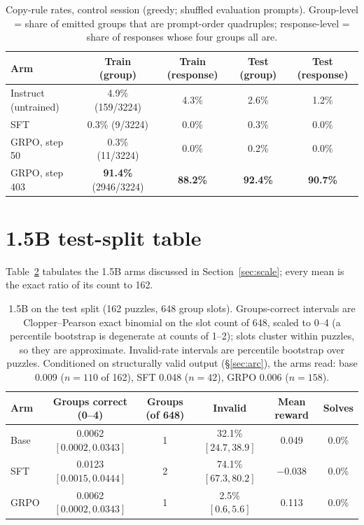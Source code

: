 \documentclass{article}
\begin{document}
\begin{table}[h]
\centering
\caption{Copy-rule rates, control session (greedy; shuffled evaluation
prompts). Group-level = share of emitted groups that are prompt-order
quadruples; response-level = share of responses whose four groups all are.}
\label{tab:copy}
\small
\setlength{\tabcolsep}{4pt}
\begin{tabular}{lcccc}
\toprule
Arm & Train (group) & Train (response) & Test (group) & Test (response) \\
\midrule
Instruct (untrained) & 4.9\% (159/3224) & 4.3\% & 2.6\% & 1.2\% \\
SFT & 0.3\% (9/3224) & 0.0\% & 0.3\% & 0.0\% \\
GRPO, step 50 & 0.3\% (11/3224) & 0.0\% & 0.2\% & 0.0\% \\
GRPO, step 403 & \textbf{91.4\%} (2946/3224) & \textbf{88.2\%} & \textbf{92.4\%} & \textbf{90.7\%} \\
\bottomrule
\end{tabular}
\end{table}

\section{1.5B test-split table}
\label{app:small}

Table~\ref{tab:small} tabulates the 1.5B arms discussed in
Section~\ref{sec:scale}; every mean is the exact ratio of its count to 162.

\begin{table}[h]
\centering
\caption{1.5B on the test split (162 puzzles, 648 group slots).
Groups-correct intervals are Clopper--Pearson exact binomial on the slot
count of 648, scaled to 0--4 (a percentile bootstrap is degenerate at counts
of 1--2); slots cluster within puzzles, so they are approximate.
Invalid-rate intervals are percentile bootstrap over puzzles. Conditioned on
structurally valid output (\S\ref{sec:arc}), the arms read: base 0.009
($n=110$ of 162), SFT 0.048 ($n=42$), GRPO 0.006 ($n=158$).}
\label{tab:small}
\small
\setlength{\tabcolsep}{4pt}
\begin{tabular}{lccccc}
\toprule
Arm & Groups correct (0--4) & Groups (of 648) & Invalid & Mean reward & Solves \\
\midrule
Base & 0.0062 $[0.0002, 0.0343]$ & 1 & 32.1\% $[24.7, 38.9]$ & 0.049 & 0.0\% \\
SFT  & 0.0123 $[0.0015, 0.0444]$ & 2 & 74.1\% $[67.3, 80.2]$ & $-0.038$ & 0.0\% \\
GRPO & 0.0062 $[0.0002, 0.0343]$ & 1 & 2.5\% $[0.6, 5.6]$ & 0.113 & 0.0\% \\
\bottomrule
\end{tabular}
\end{table}
\end{document}

